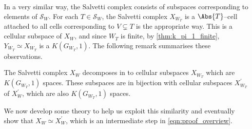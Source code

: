 \documentclass[class=article, crop=false]{standalone}
\begin{document}
In a very similar way, the Salvetti complex consists of subspaces corresponding to elements of $\mathcal{S}_W$. For each $T \in \mathcal{S}_W$, the Salvetti complex $X_{W_T}$ is a $\Abs{T}$--cell attached to all cells corresponding to $V \subsetneq T$ is the appropriate way. This is a cellular subspace of $X_W$, and since $W_T$ is finite, by \cref{thm:k_pi_1_finite}, $Y_{W_T} \simeq X_{W_T}$ is a $K(G_{W_T},1)$. The following remark summarises these observations.

\begin{remark}
    The Salvetti complex $X_W$ decomposes in to cellular subspaces $X_{W_T}$ which are $K(G_{W_T},1)$ spaces. These subspaces are in bijection with cellular subspaces $X^\prime_{W_T}$ of $X^\prime_W$, which are also $K(G_{W_T},1)$ spaces.
    \label{rmk:salvetti_X_prime_similarities}
\end{remark}

We now develop some theory to help us exploit this similarity and eventually show that $X_W \simeq X^\prime_{W}$, which is an intermediate step in \eqref{eqn:proof_overview}.
\end{document}

